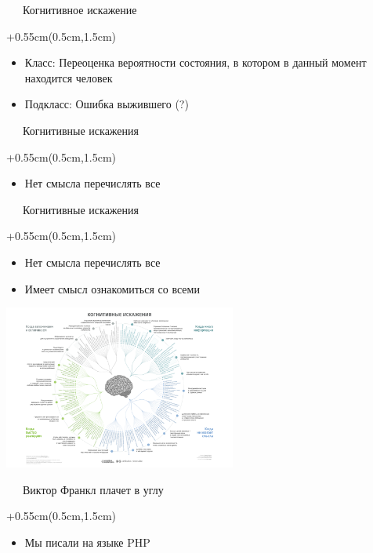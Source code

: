 \documentclass[xetex,18pt,aspectratio=169]{beamer}
\begin{document}
\begin{Large}
\begin{frame}{\ \ \ Когнитивное искажение}
\begin{textblock*}{\framewidth+0.55cm}(0.5cm,1.5cm)
\begin{itemize}
  \item Класс: Переоценка вероятности состояния, в котором в данный момент находится человек
  \item Подкласс: Ошибка выжившего (?)
\end{itemize}
\end{textblock*}
\end{frame}

\begin{frame}{\ \ \ Когнитивные искажения}
\begin{textblock*}{\framewidth+0.55cm}(0.5cm,1.5cm)
\begin{itemize}
  \item Нет смысла перечислять все
\end{itemize}
\end{textblock*}
\end{frame}

\begin{frame}{\ \ \ Когнитивные искажения}
\begin{textblock*}{\framewidth+0.55cm}(0.5cm,1.5cm)
\begin{itemize}
  \item Нет смысла перечислять все
  \item Имеет смысл ознакомиться со всеми
\end{itemize}
\begin{minipage}{\textwidth}
  \centering
  \includegraphics[height=5.4cm]{img/cogn}
\end{minipage}
\end{textblock*}
\end{frame}

\begin{frame}{\ \ \ Виктор Франкл плачет в углу}
\begin{textblock*}{\framewidth+0.55cm}(0.5cm,1.5cm)
\begin{itemize}
  \item Мы писали на языке PHP
\end{itemize}
\end{textblock*}
\end{frame}


\end{Large}
\end{document}
